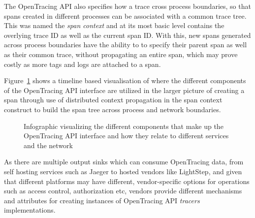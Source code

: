 \documentclass[12pt,pdftex,titlepage]{report}
\begin{document}
                The OpenTracing API also specifies how a trace cross process boundaries, so that spans created in different processes can be
                associated with a common trace tree. This was named the \textit{span context} and at its most basic level contains the 
                overlying trace ID as well as the current span ID. With this, new spans generated across process boundaries have the ability to
                to specify their parent span as well as their common trace, without propagating an entire span, which may prove costly as more
                tags and logs are attached to a span.

                Figure~\ref{fig:opentracing} shows a timeline based visualisation of where the different components of the OpenTracing API interface are utilized in
                the larger picture of creating a span through use of distributed context propagation in the span context construct to build the span tree across
                process and network boundaries.
                
                \begin{figure}[hbt!]
                    \centering
                    \caption{Infographic visualizing the different components that make up the OpenTracing API interface and how they relate to different services
                    and the network}
                    \label{fig:opentracing}
                \end{figure}

                As there are multiple output sinks which can consume OpenTracing data, from self hosting services such as Jaeger to hosted vendors like LightStep, and given that
                different platforms may have different, vendor-specific options for operations such as access control, authorization etc, vendors provide different mechanisms
                and attributes for creating instances of OpenTracing API \textit{tracers} implementations.
\end{document}
